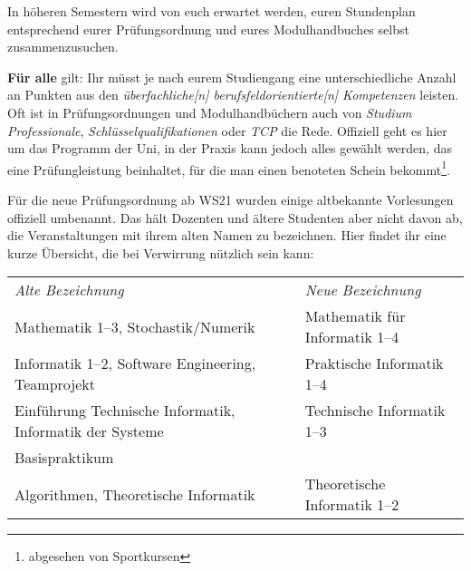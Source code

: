 In höheren Semestern wird von euch erwartet werden, euren Stundenplan
entsprechend eurer Prüfungsordnung und eures Modulhandbuches selbst
zusammenzusuchen. %

\textbf{Für alle} gilt: Ihr müsst je nach eurem Studiengang eine
unterschiedliche Anzahl an Punkten aus den \emph{überfachliche[n]
berufsfeldorientierte[n] Kompetenzen} leisten. Oft ist in Prüfungsordnungen und
Modulhandbüchern auch von \emph{Studium Professionale},
\emph{Schlüsselqualifikationen} oder \emph{TCP} die Rede. Offiziell geht es
hier um das Programm der Uni, in der Praxis kann jedoch alles gewählt werden,
das eine Prüfungleistung beinhaltet, für die man einen benoteten Schein
bekommt\footnote{abgesehen von Sportkursen}.

%

Für die neue Prüfungsordnung ab WS21 wurden einige altbekannte Vorlesungen offiziell umbenannt.
Das hält Dozenten und ältere Studenten aber nicht davon ab, die Veranstaltungen mit
ihrem alten Namen zu bezeichnen. Hier findet ihr eine kurze Übersicht, die bei Verwirrung nützlich sein kann:

\begin{tabular}{ll}
\emph{Alte Bezeichnung}						& \emph{Neue Bezeichnung} \\[.4em]
Mathematik 1--3, Stochastik/Numerik	& Mathematik für Informatik 1--4 \\[.4em]
Informatik 1--2, Software Engineering, Teamprojekt & Praktische Informatik 1--4\\[.4em]
Einführung Technische Informatik, Informatik der Systeme & Technische Informatik 1--3\\
Basispraktikum & \\[.4em]
Algorithmen, Theoretische Informatik	& Theoretische Informatik 1--2 \\[.4em]
\end{tabular}

